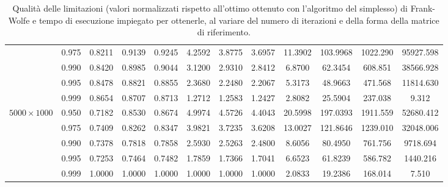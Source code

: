 \begin{landscape}
\begin{table}[!h]
\begin{tabularx}{677.40169pt}{cccccccccccc}
        & 0.975 & 0.8211 & 0.9139 & 0.9245 & 4.2592 & 3.8775 & 3.6957 & 11.3902 & 103.9968 & 1022.290 & 95927.598 \\
        & 0.990 & 0.8420 & 0.8985 & 0.9044 & 3.1200 & 2.9310 & 2.8412 & 6.8700 & 62.3454 & 608.851 & 38566.928 \\
        & 0.995 & 0.8478 & 0.8821 & 0.8855 & 2.3680 & 2.2480 & 2.2067 & 5.3173 & 48.9663 & 471.568 & 11814.630 \\
        & 0.999 & 0.8654 & 0.8707 & 0.8713 & 1.2712 & 1.2583 & 1.2427 & 2.8082 & 25.5904 & 237.038 & 9.312 \\
        \midrule
        \( 5000\times 1000 \)
        & 0.950 & 0.7182 & 0.8530 & 0.8674 & 4.9974 & 4.5726 & 4.4043 & 20.5998 & 197.0393 & 1911.559 & 52680.412 \\
        & 0.975 & 0.7409 & 0.8262 & 0.8347 & 3.9821 & 3.7235 & 3.6208 & 13.0027 & 121.8646 & 1239.010 & 32048.006 \\
        & 0.990 & 0.7378 & 0.7818 & 0.7858 & 2.5930 & 2.5263 & 2.4800 & 8.6056 & 80.4950 & 761.756 & 9718.694 \\
        & 0.995 & 0.7253 & 0.7464 & 0.7482 & 1.7859 & 1.7366 & 1.7041 & 6.6523 & 61.8239 & 586.782 & 1440.216 \\
        & 0.999 & 1.0000 & 1.0000 & 1.0000 & 1.0000 & 1.0000 & 1.0000 & 2.0833 & 19.2386 & 168.014 & 7.510 \\
        \bottomrule
    \end{tabularx}
    \caption{Qualità delle limitazioni (valori normalizzati rispetto all'ottimo ottenuto con l'algoritmo del simplesso)
    di Frank-Wolfe e tempo di esecuzione impiegato per ottenerle, al variare del numero di iterazioni e della forma
    della matrice di riferimento.}
    \label{table:hugetable3}
\end{table}
\end{landscape}

